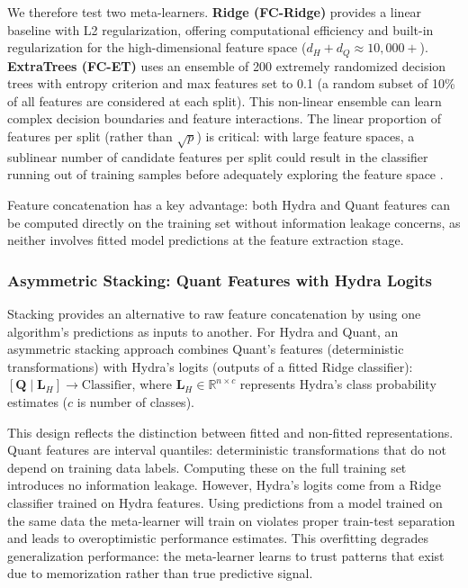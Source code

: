 \documentclass[pdflatex,sn-basic]{sn-jnl}           %
\theoremstyle{thmstyleone}%
\theoremstyle{thmstyletwo}%
\theoremstyle{thmstylethree}%
\begin{document}
We therefore test two meta-learners. \textbf{Ridge (FC-Ridge)} provides a linear baseline with L2 regularization, offering computational efficiency and built-in regularization for the high-dimensional feature space ($d_H + d_Q \approx 10{,}000+$). \textbf{ExtraTrees (FC-ET)} uses an ensemble of 200 extremely randomized decision trees with entropy criterion and max features set to 0.1 (a random subset of 10\% of all features are considered at each split). This non-linear ensemble can learn complex decision boundaries and feature interactions. The linear proportion of features per split (rather than $\sqrt{p}$) is critical: with large feature spaces, a sublinear number of candidate features per split could result in the classifier running out of training samples before adequately exploring the feature space \citep{quant}.

Feature concatenation has a key advantage: both Hydra and Quant features can be computed directly on the training set without information leakage concerns, as neither involves fitted model predictions at the feature extraction stage.

\subsubsection{Asymmetric Stacking: Quant Features with Hydra Logits}

Stacking \citep{stacked-generalization} provides an alternative to raw feature concatenation by using one algorithm's predictions as inputs to another. For Hydra and Quant, an asymmetric stacking approach combines Quant's features (deterministic transformations) with Hydra's logits (outputs of a fitted Ridge classifier): $[\mathbf{Q} \mid \mathbf{L}_H] \rightarrow \text{Classifier}$, where $\mathbf{L}_H \in \mathbb{R}^{n \times c}$ represents Hydra's class probability estimates ($c$ is number of classes).

This design reflects the distinction between fitted and non-fitted representations. Quant features are interval quantiles: deterministic transformations that do not depend on training data labels. Computing these on the full training set introduces no information leakage. However, Hydra's logits come from a Ridge classifier trained on Hydra features. Using predictions from a model trained on the same data the meta-learner will train on violates proper train-test separation and leads to overoptimistic performance estimates. This overfitting degrades generalization performance: the meta-learner learns to trust patterns that exist due to memorization rather than true predictive signal.
\end{document}
